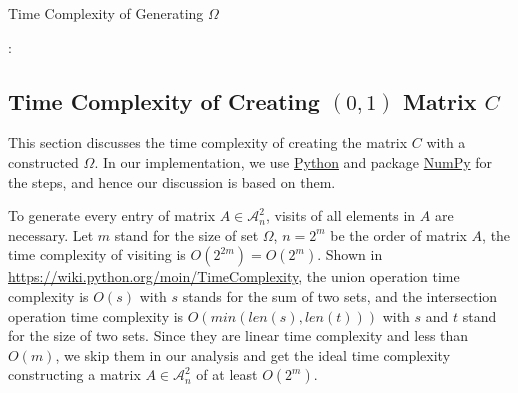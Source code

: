 \documentclass[11pt]{article}
\begin{document}
\begin{algorithm}[H] 
    \caption{Time Complexity of Generating $\Omega$}
    \label{alg:loop_tc}
    \begin{algorithmic}[1]
    \Ensure{$\Omega$}
       
         
                      
             
                 
                : 
                     
                \EndIf
                 
                     
                \EndFor
            \EndFor
        \EndFor
        \State \Return {$\Omega$}
    \end{algorithmic}
\end{algorithm}

\subsection{Time Complexity of Creating $(0, 1)$ Matrix $C$}
This section discusses the time complexity of creating the matrix $C$ with a constructed $\Omega$. In our implementation, we use \href{https://www.python.org/}{Python} and package \href{https://numpy.org/}{NumPy} for the steps, and hence our discussion is based on them.

To generate every entry of matrix $A \in \mathcal{A}_n^2$, visits of all elements in $A$ are necessary. Let $m$ stand for the size of set $\Omega$, $n=2^m$ be the order of matrix $A$, the time complexity of visiting is $O(2^{2m}) = O(2^m)$. Shown in \url{https://wiki.python.org/moin/TimeComplexity}, the union operation time complexity is $O(s)$ with $s$ stands for the sum of two sets, and the intersection operation time complexity is $O(min(len(s), len(t)))$ with $s$ and $t$ stand for the size of two sets. Since they are linear time complexity and less than $O(m)$, we skip them in our analysis and get the ideal time complexity constructing a matrix $A \in \mathcal{A}_n^2$ of at least $O(2^m)$.
\end{document}
